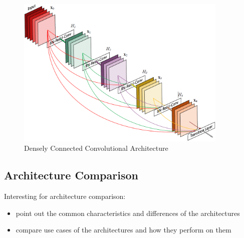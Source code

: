 \begin{figure}[h]
    \centering
    \includegraphics[width=0.9\textwidth]{images/dense-net-architecture}
    \caption{Densely Connected Convolutional Architecture \cite{densenet18}}
    \label{fig:densenet_architecture}
\end{figure}

\subsection{Architecture Comparison}
Interesting for architecture comparison: \cite{imseg_architecures}

\begin{itemize}
    \item point out the common characteristics and differences of the architectures
    \item compare use cases of the architectures and how they perform on them
\end{itemize}

\newpage